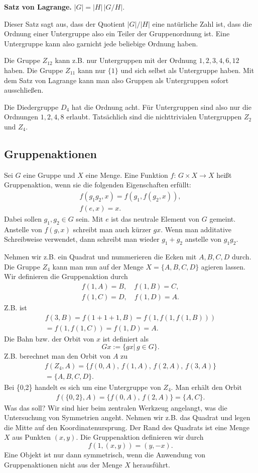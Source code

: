 \documentclass[a4paper,10pt,fleqn,twocolumn,twoside]{article}
\begin{document}
\textbf{Satz von Lagrange.} $|G|=|H|\,|G/H|$.

Dieser Satz sagt aus, dass der Quotient $|G|/|H|$ eine natürliche Zahl ist, dass die Ordnung einer Untergruppe also ein Teiler der Gruppenordnung ist. Eine Untergruppe kann also garnicht jede beliebige Ordnung haben.

Die Gruppe $Z_{12}$ kann z.B. nur Untergruppen mit der Ordnung $1,2,3,4,6,12$ haben. Die Gruppe $Z_{11}$ kann nur $\{1\}$ und sich selbst als Untergruppe haben. Mit dem Satz von Lagrange kann man also Gruppen als Untergruppen sofort ausschließen.

Die Diedergruppe $D_4$ hat die Ordnung acht. Für Untergruppen sind also nur die Ordnungen $1,2,4,8$ erlaubt. Tatsächlich sind die nichttrivialen Untergruppen $Z_2$ und $Z_4$.

\subsection{Gruppenaktionen}

Sei $G$ eine Gruppe und $X$ eine Menge. Eine Funktion $f{:}\,G\times X\rightarrow X$ heißt Gruppenaktion, wenn sie die folgenden Eigenschaften erfüllt:
\begin{gather*}
f(g_1g_2,x) = f(g_1,f(g_2,x)),\\
f(e,x) = x.
\end{gather*}
Dabei sollen $g_1,g_2\in G$ sein. Mit $e$ ist das neutrale Element von $G$ gemeint. Anstelle von $f(g,x)$ schreibt man auch kürzer $gx$. Wenn man additative Schreibweise verwendet, dann schreibt man wieder $g_1+g_2$ anstelle von $g_1g_2$.

Nehmen wir z.B. ein Quadrat und nummerieren die Ecken mit $A,B,C,D$ durch. Die Gruppe $Z_4$ kann man nun auf der Menge $X=\{A,B,C,D\}$ agieren lassen. Wir definieren die Gruppenaktion durch
\begin{gather*}
f(1,A)=B,\quad f(1,B)=C,\\
f(1,C)=D,\quad f(1,D)=A.
\end{gather*}
%
Z.B. ist
\begin{gather*}
f(3,B) = f(1+1+1,B) = f(1,f(1,f(1,B)))\\
= f(1,f(1,C)) = f(1,D) = A.
\end{gather*}
%
Die Bahn bzw. der Orbit von $x$ ist definiert als
\[Gx := \{gx|\,g\in G\}.\]
Z.B. berechnet man den Orbit von $A$ zu
\begin{gather*}
f(Z_4,A) = \{f(0,A),\,f(1,A),\,f(2,A),\,f(3,A)\}\\
= \{A,B,C,D\}.
\end{gather*}
Bei \{0,2\} handelt es sich um eine Untergruppe von $Z_4$. Man erhält den Orbit
\begin{gather*}
f(\{0,2\},A) = \{f(0,A),\,f(2,A)\} = \{A,C\}.
\end{gather*}
%
Was das soll? Wir sind hier beim zentralen Werkzeug angelangt, was die Untersuchung von Symmetrien angeht. Nehmen wir z.B. das Quadrat und legen die Mitte auf den Koordinatenursprung. Der Rand des Quadrats ist eine Menge $X$ aus Punkten $(x,y)$. Die Gruppenaktion definieren wir durch
\[f(1,(x,y)) = (y,-x).\]
Eine Objekt ist nur dann symmetrisch, wenn die Anwendung von Gruppenaktionen nicht aus der Menge $X$ herausführt.
\end{document}
